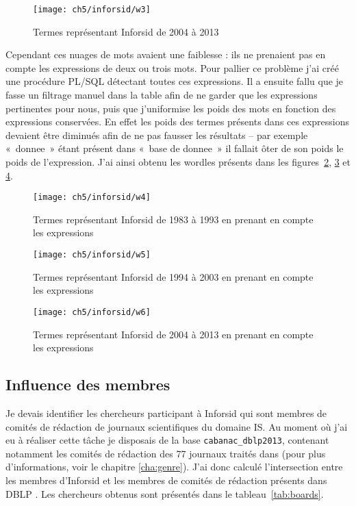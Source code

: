 			\begin{figure}[p]
				\centering
				\texttt{[image: ch5/inforsid/w3]}
				\caption{Termes représentant Inforsid de 2004 à 2013}\label{fig:n3}
			\end{figure}
		
			Cependant ces nuages de mots avaient une faiblesse : ils ne prenaient pas en compte les expressions de deux ou trois mots. Pour pallier ce problème j'ai créé une procédure PL/SQL détectant toutes ces expressions. Il a ensuite fallu que je fasse un filtrage manuel dans la table afin de ne garder que les expressions pertinentes pour nous, puis que j'uniformise les poids des mots en fonction des expressions conservées. En effet les poids des termes présents dans ces expressions devaient être diminués afin de ne pas fausser les résultats -- par exemple «~donnee~» étant présent dans «~base de donnee~» il fallait ôter de son poids le poids de l'expression. J'ai ainsi obtenu les wordles présents dans les figures~\ref{fig:w4}, \ref{fig:w5} et \ref{fig:w6}.
		
			\begin{figure}[p]
				\centering
				\texttt{[image: ch5/inforsid/w4]}
				\caption{Termes représentant Inforsid de 1983 à 1993 en prenant en compte les expressions}\label{fig:w4}
			\end{figure}
		
			\begin{figure}[p]
				\centering
				\texttt{[image: ch5/inforsid/w5]}
				\caption{Termes représentant Inforsid de 1994 à 2003 en prenant en compte les expressions}\label{fig:w5}
			\end{figure}
		
			\begin{figure}[p]
				\centering
				\texttt{[image: ch5/inforsid/w6]}
				\caption{Termes représentant Inforsid de 2004 à 2013 en prenant en compte les expressions}\label{fig:w6}
			\end{figure}
	
	
		\subsection{Influence des membres}
			Je devais identifier les chercheurs participant à Inforsid qui sont membres de comités de rédaction de journaux scientifiques du domaine IS. Au moment où j'ai eu à réaliser cette tâche je disposais de la base \texttt{cabanac\_dblp2013}, contenant notamment les comités de rédaction des 77 journaux traités dans \citep{shaping} (pour plus d'informations, voir le chapitre \ref{cha:genre}). J'ai donc calculé l'intersection entre les membres d'Inforsid et les membres de comités de rédaction présents dans DBLP . Les chercheurs obtenus sont présentés dans le tableau~\ref{tab:boards}.
		

